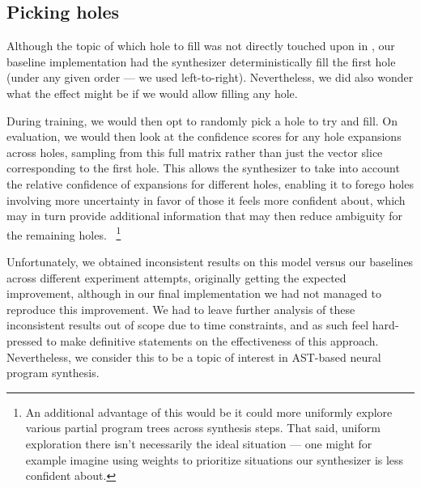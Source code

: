 \documentclass{article}
\begin{document}
\subsection{Picking holes}

Although the topic of which hole to fill was not directly touched upon in \citet{nsps},
our baseline implementation had the synthesizer deterministically fill the first hole
(under any given order --- we used left-to-right).
Nevertheless, we did also wonder what the effect might be if we would allow filling any hole.

During training, we would then opt to randomly pick a hole to try and fill.
On evaluation, we would then look at the confidence scores for any hole expansions across holes,
sampling from this full matrix rather than just the vector slice corresponding to the first hole.
This allows the synthesizer to take into account the relative confidence of expansions for different holes,
enabling it to forego holes involving more uncertainty in favor of those it feels more confident about,
which may in turn provide additional information that may then reduce ambiguity for the remaining holes.%
~\footnote{
    An additional advantage of this would be it could more uniformly explore various partial program trees across synthesis steps.
    That said, uniform exploration there isn't necessarily the ideal situation ---
    one might for example imagine using weights to prioritize situations our synthesizer is less confident about.
}

Unfortunately, we obtained inconsistent results on this model versus our baselines across different experiment attempts,
originally getting the expected improvement, although in our final implementation we had not managed to reproduce this improvement.
We had to leave further analysis of these inconsistent results out of scope due to time constraints,
and as such feel hard-pressed to make definitive statements on the effectiveness of this approach.
Nevertheless, we consider this to be a topic of interest in AST-based neural program synthesis.
\end{document}
